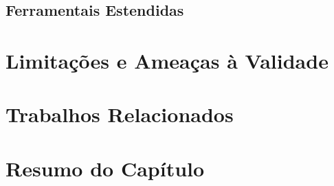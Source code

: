 \subsection{Ferramentais Estendidas}
\label{sub:ferrramentas_extendidas}


\section{Limitações e Ameaças à Validade}

\section{Trabalhos Relacionados}

\section{Resumo do Capítulo}